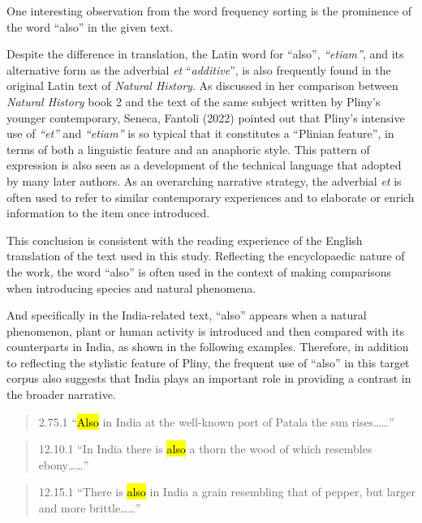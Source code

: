 \documentclass[
  12pt,
]{article}
\begin{document}
One interesting observation from the word frequency sorting is the
prominence of the word ``also'' in the given text.

Despite the difference in translation, the Latin word for ``also'',
\emph{``etiam''}, and its alternative form as the adverbial \emph{et}
``\emph{additive}'', is also frequently found in the original Latin text
of \emph{Natural History}. As discussed in her comparison between
\emph{Natural History} book 2 and the text of the same subject written
by Pliny's younger contemporary, Seneca, Fantoli (2022) pointed out that
Pliny's intensive use of \emph{``et''} and \emph{``etiam''} is so
typical that it constitutes a ``Plinian feature'', in terms of both a
linguistic feature and an anaphoric style. This pattern of expression is
also seen as a development of the technical language that adopted by
many later authors. As an overarching narrative strategy, the adverbial
\emph{et} is often used to refer to similar contemporary experiences and
to elaborate or enrich information to the item once introduced.

This conclusion is consistent with the reading experience of the English
translation of the text used in this study. Reflecting the encyclopaedic
nature of the work, the word ``also'' is often used in the context of
making comparisons when introducing species and natural phenomena.

And specifically in the India-related text, ``also'' appears when a
natural phenomenon, plant or human activity is introduced and then
compared with its counterparts in India, as shown in the following
examples. Therefore, in addition to reflecting the stylistic feature of
Pliny, the frequent use of ``also'' in this target corpus also suggests
that India plays an important role in providing a contrast in the
broader narrative.

\begin{quote}
2.75.1 ``\hl{Also} in India at the well-known port of Patala the sun
rises\ldots\ldots{}''
\end{quote}

\begin{quote}
12.10.1 ``In India there is \hl{also} a thorn the wood of which
resembles ebony\ldots\ldots{}''
\end{quote}

\begin{quote}
12.15.1 ``There is \hl{also} in India a grain resembling that of pepper,
but larger and more brittle\ldots\ldots{}''
\end{quote}
\end{document}
